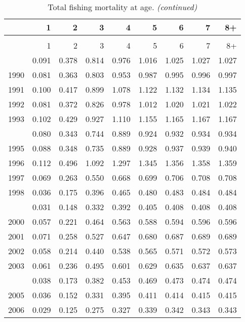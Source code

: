 \documentclass[
]{article}
\begin{document}
\begin{longtable}[t]{lrrrrrrrr}
\caption{\label{tab:FAA-tot-table}Total fishing mortality at age.}\\
\toprule
  & 1 & 2 & 3 & 4 & 5 & 6 & 7 & 8+\\
\midrule
\endfirsthead
\caption[]{Total fishing mortality at age. \textit{(continued)}}\\
\toprule
  & 1 & 2 & 3 & 4 & 5 & 6 & 7 & 8+\\
\midrule
\endhead

\endfoot
\bottomrule
\endlastfoot
1989 & 0.091 & 0.378 & 0.814 & 0.976 & 1.016 & 1.025 & 1.027 & 1.027\\
1990 & 0.081 & 0.363 & 0.803 & 0.953 & 0.987 & 0.995 & 0.996 & 0.997\\
1991 & 0.100 & 0.417 & 0.899 & 1.078 & 1.122 & 1.132 & 1.134 & 1.135\\
1992 & 0.081 & 0.372 & 0.826 & 0.978 & 1.012 & 1.020 & 1.021 & 1.022\\
1993 & 0.102 & 0.429 & 0.927 & 1.110 & 1.155 & 1.165 & 1.167 & 1.167\\
\addlinespace
1994 & 0.080 & 0.343 & 0.744 & 0.889 & 0.924 & 0.932 & 0.934 & 0.934\\
1995 & 0.088 & 0.348 & 0.735 & 0.889 & 0.928 & 0.937 & 0.939 & 0.940\\
1996 & 0.112 & 0.496 & 1.092 & 1.297 & 1.345 & 1.356 & 1.358 & 1.359\\
1997 & 0.069 & 0.263 & 0.550 & 0.668 & 0.699 & 0.706 & 0.708 & 0.708\\
1998 & 0.036 & 0.175 & 0.396 & 0.465 & 0.480 & 0.483 & 0.484 & 0.484\\
\addlinespace
1999 & 0.031 & 0.148 & 0.332 & 0.392 & 0.405 & 0.408 & 0.408 & 0.408\\
2000 & 0.057 & 0.221 & 0.464 & 0.563 & 0.588 & 0.594 & 0.596 & 0.596\\
2001 & 0.071 & 0.258 & 0.527 & 0.647 & 0.680 & 0.687 & 0.689 & 0.689\\
2002 & 0.058 & 0.214 & 0.440 & 0.538 & 0.565 & 0.571 & 0.572 & 0.573\\
2003 & 0.061 & 0.236 & 0.495 & 0.601 & 0.629 & 0.635 & 0.637 & 0.637\\
\addlinespace
2004 & 0.038 & 0.173 & 0.382 & 0.453 & 0.469 & 0.473 & 0.474 & 0.474\\
2005 & 0.036 & 0.152 & 0.331 & 0.395 & 0.411 & 0.414 & 0.415 & 0.415\\
2006 & 0.029 & 0.125 & 0.275 & 0.327 & 0.339 & 0.342 & 0.343 & 0.343\\

\end{longtable}
\end{document}
